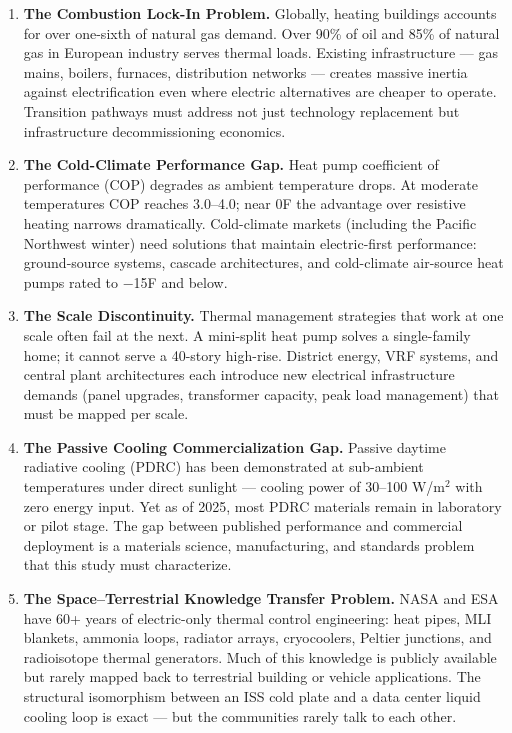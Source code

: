 \documentclass[11pt,letterpaper]{article}
\begin{document}
\begin{enumerate}[leftmargin=2em]
\item \textbf{The Combustion Lock-In Problem.} Globally, heating buildings accounts for over one-sixth of natural gas demand. Over 90\% of oil and 85\% of natural gas in European industry serves thermal loads. Existing infrastructure --- gas mains, boilers, furnaces, distribution networks --- creates massive inertia against electrification even where electric alternatives are cheaper to operate. Transition pathways must address not just technology replacement but infrastructure decommissioning economics.

\item \textbf{The Cold-Climate Performance Gap.} Heat pump coefficient of performance (COP) degrades as ambient temperature drops. At moderate temperatures COP reaches 3.0--4.0; near 0\textdegree F the advantage over resistive heating narrows dramatically. Cold-climate markets (including the Pacific Northwest winter) need solutions that maintain electric-first performance: ground-source systems, cascade architectures, and cold-climate air-source heat pumps rated to $-$15\textdegree F and below.

\item \textbf{The Scale Discontinuity.} Thermal management strategies that work at one scale often fail at the next. A mini-split heat pump solves a single-family home; it cannot serve a 40-story high-rise. District energy, VRF systems, and central plant architectures each introduce new electrical infrastructure demands (panel upgrades, transformer capacity, peak load management) that must be mapped per scale.

\item \textbf{The Passive Cooling Commercialization Gap.} Passive daytime radiative cooling (PDRC) has been demonstrated at sub-ambient temperatures under direct sunlight --- cooling power of 30--100 W/m$^{2}$ with zero energy input. Yet as of 2025, most PDRC materials remain in laboratory or pilot stage. The gap between published performance and commercial deployment is a materials science, manufacturing, and standards problem that this study must characterize.

\item \textbf{The Space--Terrestrial Knowledge Transfer Problem.} NASA and ESA have 60+ years of electric-only thermal control engineering: heat pipes, MLI blankets, ammonia loops, radiator arrays, cryocoolers, Peltier junctions, and radioisotope thermal generators. Much of this knowledge is publicly available but rarely mapped back to terrestrial building or vehicle applications. The structural isomorphism between an ISS cold plate and a data center liquid cooling loop is exact --- but the communities rarely talk to each other.
\end{enumerate}
\end{document}
